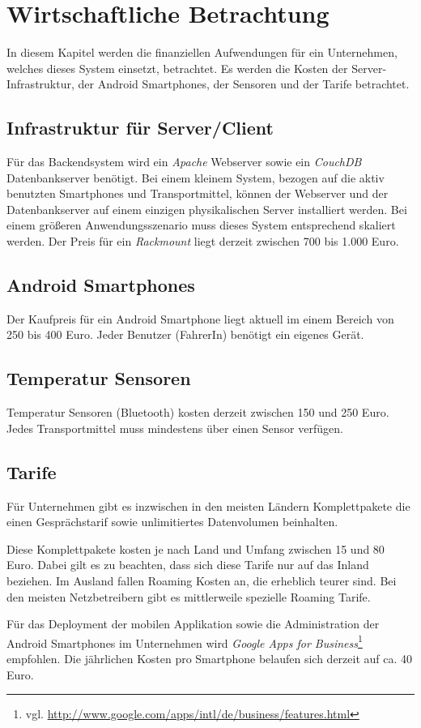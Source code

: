 \section{Wirtschaftliche Betrachtung}
\label{sec:business}

In diesem Kapitel werden die finanziellen Aufwendungen für ein Unternehmen, welches
	dieses System einsetzt, betrachtet. Es werden die Kosten der Server-Infrastruktur,
	der Android Smartphones, der Sensoren und der Tarife betrachtet.

\subsection{Infrastruktur für Server/Client}

Für das Backendsystem wird ein \emph{Apache} Webserver sowie ein \emph{CouchDB}
	Datenbankserver benötigt. Bei einem kleinem System, bezogen auf die aktiv
	benutzten Smartphones und Transportmittel, können der Webserver und der
	Datenbankserver auf einem einzigen physikalischen Server installiert werden.
	Bei einem größeren Anwendungsszenario muss dieses System entsprechend
	skaliert werden. Der Preis für ein \emph{Rackmount} liegt derzeit zwischen
	700 bis 1.000 Euro.

\subsection{Android Smartphones}

Der Kaufpreis für ein Android Smartphone liegt aktuell im einem Bereich von 250
	bis 400 Euro. Jeder Benutzer (FahrerIn) benötigt ein eigenes Gerät.

\subsection{Temperatur Sensoren}

Temperatur Sensoren (Bluetooth) kosten derzeit zwischen 150 und 250 Euro.
	Jedes Transportmittel muss mindestens über einen Sensor verfügen.

\subsection{Tarife}

Für Unternehmen gibt es inzwischen in den meisten Ländern Komplettpakete die
	einen Gesprächstarif sowie unlimitiertes Datenvolumen beinhalten.
	
Diese Komplettpakete kosten je nach Land und Umfang zwischen 15 und 80 Euro.
	Dabei gilt es zu beachten, dass sich diese Tarife nur auf das Inland beziehen.
	Im Ausland fallen Roaming Kosten an, die erheblich teurer sind. Bei den meisten
	Netzbetreibern gibt es mittlerweile spezielle Roaming Tarife.

Für das Deployment der mobilen Applikation sowie die Administration der Android
	Smartphones im Unternehmen wird \emph{Google Apps for Business}\footnote{vgl.
	\url{http://www.google.com/apps/intl/de/business/features.html}} empfohlen.
	Die jährlichen Kosten pro Smartphone belaufen sich derzeit auf ca. 40 Euro.


